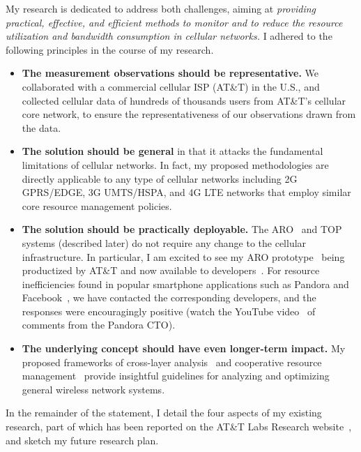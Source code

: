 \documentclass[10pt]{article}
\begin{document}
\begin{small}
My research is dedicated to address both challenges, aiming at \emph{providing practical, effective, and efficient methods to monitor and to reduce the resource utilization and bandwidth consumption in cellular networks.} I adhered to the following principles in the course of my research.
\begin{itemize}
  \item \textbf{The measurement observations should be representative.} We collaborated with a commercial cellular ISP (AT\&T) in the U.S., and collected cellular data of hundreds of thousands users from AT\&T's cellular core network, to ensure the representativeness of our observations drawn from the data.
  \item \textbf{The solution should be general} in that it attacks the fundamental limitations of cellular networks. In fact, my proposed methodologies are directly applicable to any type of cellular networks including 2G GPRS/EDGE, 3G UMTS/HSPA, and 4G LTE networks that employ similar core resource management policies.
  \item \textbf{The solution should be practically deployable.} The ARO~\cite{qian11_mobisys} and TOP~\cite{qian10_icnp} systems (described later) do not require any change to the cellular infrastructure. In particular, I am excited to see my ARO prototype~\cite{qian11_mobisys_demo} being productized by AT\&T and now available to developers~\cite{aro_production}. For resource inefficiencies found in popular smartphone applications such as Pandora and Facebook~\cite{qian11_mobisys, qian_periodic}, we have contacted the corresponding developers, and the responses were encouragingly positive (watch the YouTube video~\cite{aro_pandora} of comments from the Pandora CTO).
  \item \textbf{The underlying concept should have even longer-term impact.} My proposed frameworks of cross-layer analysis~\cite{qian11_mobisys} and cooperative resource management~\cite{qian10_icnp} provide insightful guidelines for analyzing and optimizing general wireless network systems.
\end{itemize}

In the remainder of the statement, I detail the four aspects of my existing research, part of which has been reported on the AT\&T Labs Research website~\cite{att_coverage}, and sketch my future research plan.



\end{small}
\end{document}
